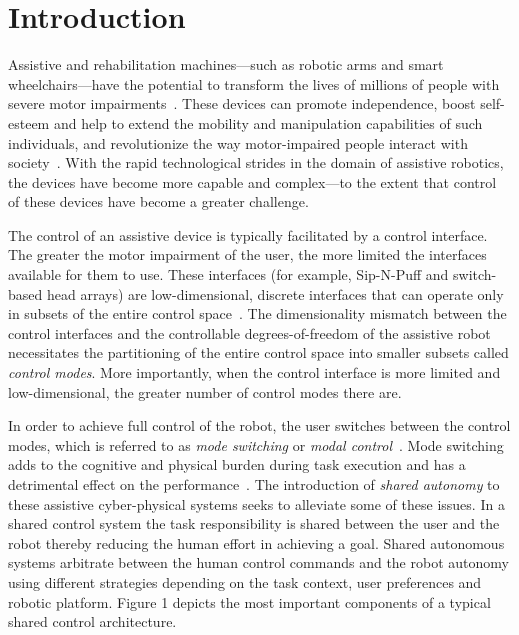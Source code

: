 \section{Introduction}\label{sec:intro}

Assistive and rehabilitation machines---such as robotic arms and smart wheelchairs---have the potential to transform the lives of millions of people with severe motor impairments~\cite{laplante1992assistive}. These devices can promote independence, boost self-esteem and help to extend the mobility and manipulation capabilities of such individuals, and revolutionize the way motor-impaired people interact with society~\cite{scherer1996outcomes, huete2012personal}. With the rapid technological strides in the domain of assistive robotics, the devices have become more capable and complex---to the extent that control of these devices have become a greater challenge. 

The control of an assistive device is typically facilitated by a control interface. The greater the motor impairment of the user, the more limited the interfaces available for them to use. These interfaces (for example, Sip-N-Puff and switch-based head arrays) are low-dimensional, discrete interfaces that can operate only in subsets of the entire control space~\cite{simpson2008tooth, nuttin2002selection}. 
The dimensionality mismatch between the control interfaces and the controllable degrees-of-freedom of the assistive robot necessitates the partitioning of the entire control space into smaller subsets called \textit{control modes}. More importantly, when the control interface is more limited and low-dimensional, the greater number of control modes there are. 

In order to achieve full control of the robot, the user switches between the control modes, which is referred to as \textit{mode switching} or \textit{modal control}~\cite{herlant2016assistive}. Mode switching adds to the cognitive and physical burden during task execution and has a detrimental effect on the performance~\cite{eftring1999technical}. The introduction of \textit{shared autonomy} to these assistive cyber-physical systems seeks to alleviate some of these issues. In a shared control system the task responsibility is shared between the user and the robot thereby reducing the human effort in achieving a goal. Shared autonomous systems arbitrate between the human control commands and the robot autonomy using different strategies depending on the task context, user preferences and robotic platform. Figure 1 depicts the most important components of a  typical shared control architecture.

